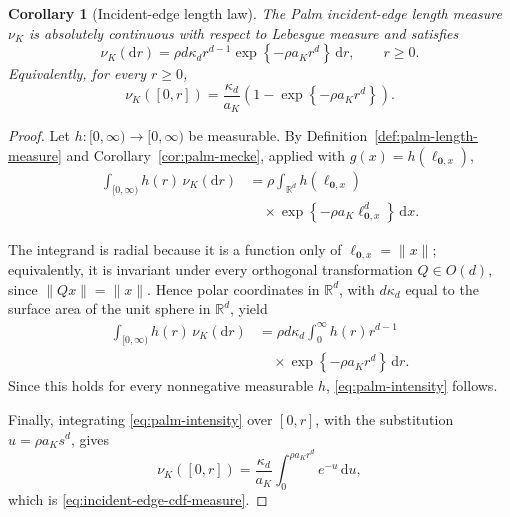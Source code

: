 \documentclass[a4paper,fleqn]{cas-dc}
\numberwithin{equation}{section}
\newcommand{\R}{\mathds{R}}
\newcommand{\1}{\mathds{1}}
\newcommand{\dd}{\mathrm{d}}
\newcommand{\ellox}{\ell_{\mathbf{0},x}}
\newcommand{\0}{\mathbf{0}}
\newtheorem{corollary}[theorem]{Corollary}
\begin{document}
\begin{corollary}[Incident-edge length law]
\label{cor:palm-intensity}
The Palm incident-edge length measure \(\nu_K\) is absolutely continuous with
respect to Lebesgue measure and satisfies
\begin{equation}\label{eq:palm-intensity}
\nu_K(\dd r)
=
\rho d\kappa_d r^{d-1}
\exp\left\{-\rho a_Kr^d\right\}
\,\dd r,
\qquad r\geq0.
\end{equation}
Equivalently, for every \(r\geq0\),
\begin{equation}\label{eq:incident-edge-cdf-measure}
\nu_K([0,r])
=
\frac{\kappa_d}{a_K}
\left(
1-\exp\left\{-\rho a_Kr^d\right\}
\right).
\end{equation}
\end{corollary}

\begin{proof}
Let \(h\colon[0,\infty)\to[0,\infty)\) be measurable. By
Definition~\ref{def:palm-length-measure} and
Corollary~\ref{cor:palm-mecke}, applied with \(g(x)=h(\ellox)\),
\begin{equation}
\begin{aligned}
\int_{[0,\infty)}
h(r)\,\nu_K(\dd r)
&=
\rho\int_{\R^d}h(\ellox)\\
&\quad{}\times\exp\left\{-\rho a_K\ellox^{d}\right\}\,\dd x.
\end{aligned}
\end{equation}

The integrand is radial because it is a function only of
\(\ellox=\|x\|\); equivalently, it is invariant under every
orthogonal transformation \(Q\in O(d)\), since
\(
\|Qx\|=\|x\|.
\)
Hence polar coordinates in \(\R^d\), with \(d\kappa_d\) equal to the
surface area of the unit sphere in \(\R^d\), yield
\begin{equation}
\begin{aligned}
\int_{[0,\infty)}
h(r)\,\nu_K(\dd r)
&=
\rho d\kappa_d\int_0^\infty h(r)r^{d-1}\\
&\quad{}\times\exp\left\{-\rho a_Kr^d\right\}\,\dd r.
\end{aligned}
\end{equation}
Since this holds for every nonnegative measurable \(h\),
\eqref{eq:palm-intensity} follows.

Finally, integrating \eqref{eq:palm-intensity} over \([0,r]\), with the
substitution \(u=\rho a_Ks^d\), gives
\begin{equation}
\nu_K([0,r])
=
\frac{\kappa_d}{a_K}
\int_0^{\rho a_Kr^d}e^{-u}\,\dd u,
\end{equation}
which is \eqref{eq:incident-edge-cdf-measure}.
\end{proof}
\end{document}
